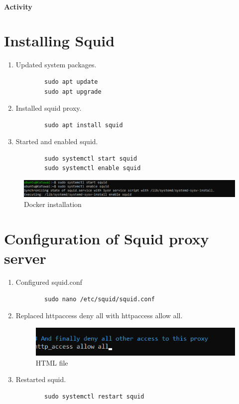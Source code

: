\documentclass[12pt]{article}
\begin{document}
\paragraph{Activity}
\section{Installing Squid}
\begin{enumerate}
    \item Updated system packages.
    \begin{verbatim}
        sudo apt update
        sudo apt upgrade
    \end{verbatim}

    \item Installed squid proxy.
    \begin{verbatim}
        sudo apt install squid 
    \end{verbatim}

    \item Started and enabled squid.
    \begin{verbatim}
        sudo systemctl start squid
        sudo systemctl enable squid
    \end{verbatim}
\end{enumerate}
\begin{figure}[h!]
    \centering
    \includegraphics[scale = 0.70]{Images/start_squid.PNG}
    \caption{Docker installation}
\end{figure}

\section{Configuration of Squid proxy server}
\begin{enumerate}
    \item Configured squid.conf
    \begin{verbatim}
        sudo nano /etc/squid/squid.conf
    \end{verbatim}
    \item Replaced http\textunderscore access deny all with http\textunderscore access allow all.
    
    \begin{figure}[h!]
        \centering
        \includegraphics{Images/squid_access.PNG}
        \caption{HTML file}
    \end{figure}

    \item Restarted squid.
    \begin{verbatim}
        sudo systemctl restart squid
    \end{verbatim}
\end{enumerate}
\end{document}
